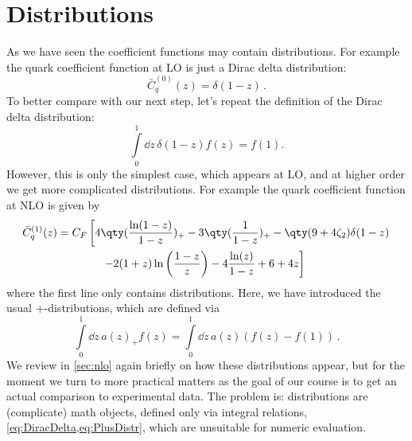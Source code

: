 \section{Distributions}
\label{sec:rsl}

As we have seen the coefficient functions may contain distributions.
For example the quark coefficient function at LO is just a Dirac delta distribution:
\begin{equation}
    \bar C_q^{(0)}(z) = \delta(1-z) \,. \label{eq:LObarCq}
\end{equation}
To better compare with our next step, let's repeat the definition of the Dirac delta distribution:
\begin{equation}
    \int\limits_0^1 \! \dd z\, \delta(1-z) f(z) = f(1).
    \label{eq:DiracDelta}
\end{equation}
However, this is only the simplest case, which appears at LO, and at higher order we get more complicated distributions.
For example the quark coefficient function at NLO is given by
\begin{align}
    \bar C_q^{(1)}(z) &= C_F \left[ 4 \qty(\frac{\ln(1-z)}{1-z})_+ - 3 \qty(\frac{1}{1-z})_+ - \qty(9+4\zeta_2)\delta(1-z)\right. \nonumber\\
    & \hspace{40pt} \left. - 2(1+z)\ln\left(\frac{1-z}{z}\right) - 4 \frac{\ln(z)}{1-z} + 6 +4z\right] \label{eq:NLObarCq}
\end{align}
where the first line only contains distributions.
Here, we have introduced the usual +-distributions, which are defined via
\begin{equation}
    \int\limits_0^1 \! \dd z\, a(z)_+ f(z) = \int\limits_0^1 \! \dd z\, a(z) \left(f(z) - f(1)\right) \,.
    \label{eq:PlusDistr}
\end{equation}
We review in \cref{sec:nlo} again briefly on how these distributions appear, but for the moment we turn to more practical matters as the goal of our course is to get an actual comparison to experimental data.
The problem is: distributions are (complicate) math objects, defined only via integral relations, \cref{eq:DiracDelta,eq:PlusDistr}, which are unsuitable for numeric evaluation.

